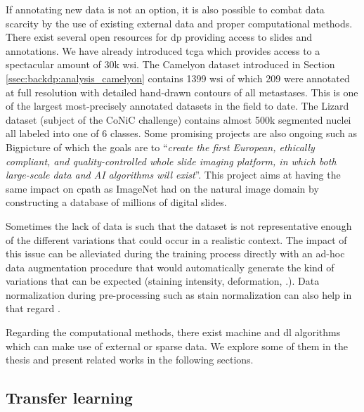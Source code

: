 If annotating new data is not an option, it is also possible to combat data scarcity by the use of existing external data and proper computational methods. There exist several open resources for \acrlong{dp} \cite{maree2019open} providing access to slides and annotations. We have already introduced \acrshort{tcga} which provides access to a spectacular amount of 30k \acrshort{wsi}. The Camelyon dataset introduced in Section \ref{ssec:backdp:analysis_camelyon} contains 1399 \acrshort{wsi} of which 209 were annotated at full resolution with detailed hand-drawn contours of all metastases. This is one of the largest most-precisely annotated datasets in the field to date. The Lizard dataset (subject of the CoNiC challenge) contains almost 500k segmented nuclei all labeled into one of 6 classes. Some promising projects are also ongoing such as Bigpicture \cite{moulin2021imi} of which the goals are to ``\textit{create the first European, ethically compliant, and quality-controlled whole slide imaging platform, in which both large-scale data and AI algorithms will exist}''. This project aims at having the same impact on \acrlong{cpath} as ImageNet had on the natural image domain by constructing a database of millions of digital slides.

Sometimes the lack of data is such that the dataset is not representative enough of the different variations that could occur in a realistic context. The impact of this issue can be alleviated during the training process directly with an ad-hoc data augmentation procedure that would automatically generate the kind of variations that can be expected (\eg staining intensity, deformation, \etc.). Data normalization during pre-processing such as stain normalization can also help in that regard \cite{kang2021stainnet, runz2021normalization}.

Regarding the computational methods, there exist machine and \acrlong{dl} algorithms which can make use of external or sparse data. We explore some of them in the thesis and present related works in the following sections. 

\subsection{Transfer learning}
\label{ssec:backdp:tl}

